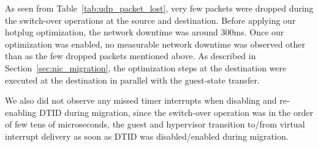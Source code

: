 As seen from Table~\ref{tab:udp_packet_lost}, very few packets
were dropped during the switch-over operations at the source and destination.
Before applying our hotplug optimization, the network downtime was
around 300ms. Once our optimization was enabled, no measurable network
downtime was observed other than as the few  dropped packets mentioned above. 
As described in Section~\ref{sec:nic_migration}, the 
optimization steps at the destination were executed at the destination 
in parallel with the guest-state transfer. 

We also did not observe any missed timer interrupts when
disabling and re-enabling DTID during migration, since the
switch-over operation was in the order of few tens of
microseconds, the guest and hypervisor transition to/from
virtual interrupt delivery as soon as DTID was
disabled/enabled during migration.






